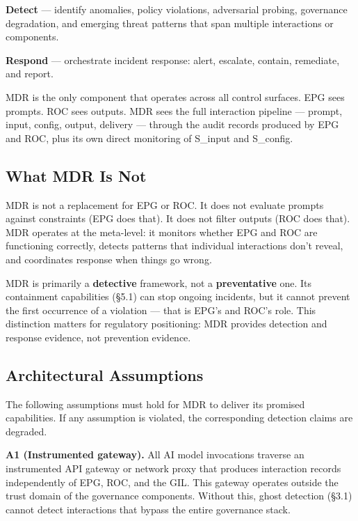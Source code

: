\textbf{Detect} --- identify anomalies, policy violations, adversarial probing, governance degradation, and emerging threat patterns that span multiple interactions or components.

\textbf{Respond} --- orchestrate incident response: alert, escalate, contain, remediate, and report.

MDR is the only component that operates across all control surfaces. EPG sees prompts. ROC sees outputs. MDR sees the full interaction pipeline --- prompt, input, config, output, delivery --- through the audit records produced by EPG and ROC, plus its own direct monitoring of S\_\allowbreak{}input and S\_\allowbreak{}config.

\subsection{What MDR Is Not}


MDR is not a replacement for EPG or ROC. It does not evaluate prompts against constraints (EPG does that). It does not filter outputs (ROC does that). MDR operates at the meta-level: it monitors whether EPG and ROC are functioning correctly, detects patterns that individual interactions don't reveal, and coordinates response when things go wrong.

MDR is primarily a \textbf{detective} framework, not a \textbf{preventative} one. Its containment capabilities (\S{}5.1) can stop ongoing incidents, but it cannot prevent the first occurrence of a violation --- that is EPG's and ROC's role. This distinction matters for regulatory positioning: MDR provides detection and response evidence, not prevention evidence.

\subsection{Architectural Assumptions}


The following assumptions must hold for MDR to deliver its promised capabilities. If any assumption is violated, the corresponding detection claims are degraded.

\textbf{A1 (Instrumented gateway).} All AI model invocations traverse an instrumented API gateway or network proxy that produces interaction records independently of EPG, ROC, and the GIL. This gateway operates outside the trust domain of the governance components. Without this, ghost detection (\S{}3.1) cannot detect interactions that bypass the entire governance stack.


